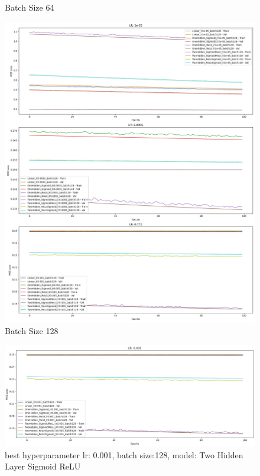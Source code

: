 \begin{figure}[!h]
\begin{minipage}{0.32\linewidth}
        \caption{Batch Size 64}
    \end{minipage}
    \hfill
    \begin{minipage}{0.32\linewidth}
        \includegraphics[width=\linewidth]{mse_model_losses_batch128.png}
        \caption{Batch Size 128}
    \end{minipage}
\end{figure}

\begin{figure}[!h]
    \centering\includegraphics[width=1\linewidth]{MSE_best.jpg}
    \caption[short]{best hyperparameter lr: 0.001, batch size:128, model: Two Hidden Layer Sigmoid ReLU}
\end{figure}

